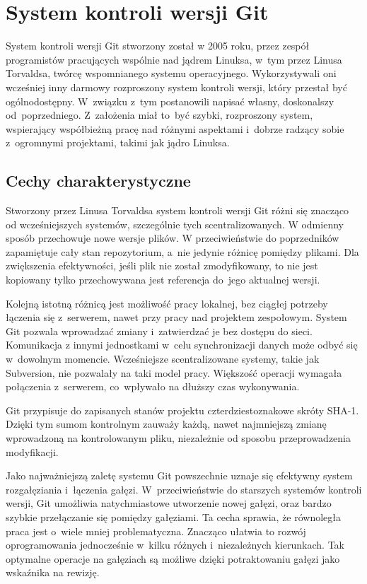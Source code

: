 \documentclass[12pt,a4paper,polish,thesis]{dcsbook}
\begin{document}
	\section{System kontroli wersji Git}

	System kontroli wersji Git stworzony został w 2005 roku, przez zespół programistów pracujących wspólnie nad jądrem Linuksa, w~tym przez Linusa Torvaldsa, twórcę wspomnianego systemu operacyjnego. Wykorzystywali oni wcześniej inny darmowy rozproszony system kontroli wersji, który przestał być ogólnodostępny. W~związku z~tym postanowili napisać własny, doskonalszy od~poprzedniego. Z~założenia miał to~być szybki, rozproszony system, wspierający współbieżną pracę nad różnymi aspektami i~dobrze radzący sobie z~ogromnymi projektami, takimi jak jądro Linuksa.

	\subsection{Cechy charakterystyczne}
	Stworzony przez Linusa Torvaldsa system kontroli wersji Git różni się znacząco od wcześniejszych systemów, szczególnie tych scentralizowanych. W odmienny sposób przechowuje nowe wersje plików. W przeciwieństwie do poprzedników zapamiętuje cały stan repozytorium, a~nie jedynie różnicę pomiędzy plikami. Dla zwiększenia efektywności, jeśli plik nie został zmodyfikowany, to nie jest kopiowany tylko przechowywana jest referencja do~jego aktualnej wersji.

	Kolejną istotną różnicą jest możliwość pracy lokalnej, bez ciągłej potrzeby łączenia się z~serwerem, nawet przy pracy nad projektem zespołowym. System Git pozwala wprowadzać zmiany i~zatwierdzać je bez dostępu do sieci. Komunikacja z innymi jednostkami w~celu synchronizacji danych może odbyć się w~dowolnym momencie. Wcześniejsze scentralizowane systemy, takie jak Subversion, nie pozwalały na taki model pracy. Większość operacji wymagała połączenia z~serwerem, co~wpływało na dłuższy czas wykonywania.

	Git przypisuje do zapisanych stanów projektu czterdziestoznakowe skróty SHA-1. Dzięki tym sumom kontrolnym zauważy każdą, nawet najmniejszą zmianę wprowadzoną na kontrolowanym pliku, niezależnie od sposobu przeprowadzenia modyfikacji.

	Jako najważniejszą zaletę systemu Git powszechnie uznaje się efektywny system rozgałęziania i~łączenia gałęzi. W~przeciwieństwie do starszych systemów kontroli wersji, Git umożliwia natychmiastowe utworzenie nowej gałęzi, oraz bardzo szybkie przełączanie się pomiędzy gałęziami. Ta cecha sprawia, że równoległa praca jest o~wiele mniej problematyczna. Znacząco ułatwia to rozwój oprogramowania jednocześnie w~kilku różnych i~niezależnych kierunkach. Tak optymalne operacje na gałęziach są możliwe dzięki potraktowaniu gałęzi jako wskaźnika na rewizję.
\end{document}
